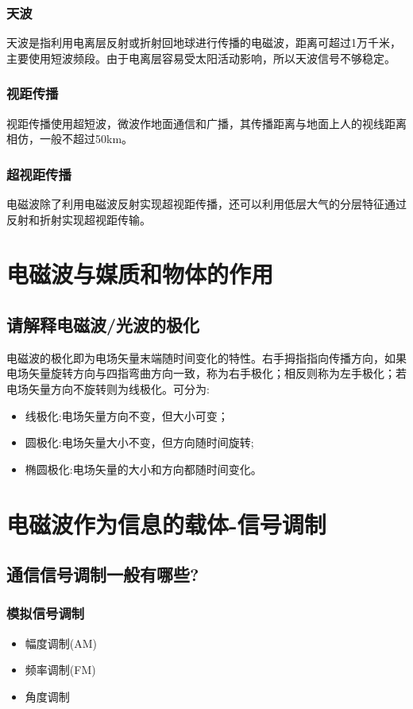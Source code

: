\documentclass[UTF8]{article}
\begin{document}
\begin{CJK}{UTF8}{gkai}
\subsubsection{天波}
天波是指利用电离层反射或折射回地球进行传播的电磁波，距离可超过1万千米，主要使用短波频段。由于电离层容易受太阳活动影响，所以天波信号不够稳定。
\subsubsection{视距传播}
视距传播使用超短波，微波作地面通信和广播，其传播距离与地面上人的视线距离相仿，一般不超过50km。
\subsubsection{超视距传播}
电磁波除了利用电磁波反射实现超视距传播，还可以利用低层大气的分层特征通过反射和折射实现超视距传输。
\section{电磁波与媒质和物体的作用}
\subsection{请解释电磁波/光波的极化}
电磁波的极化即为电场矢量末端随时间变化的特性。右手拇指指向传播方向，如果电场矢量旋转方向与四指弯曲方向一致，称为右手极化；相反则称为左手极化；若电场矢量方向不旋转则为线极化。可分为:
\begin{itemize}
  \item 线极化:电场矢量方向不变，但大小可变；
  \item 圆极化:电场矢量大小不变，但方向随时间旋转;
  \item 椭圆极化:电场矢量的大小和方向都随时间变化。
\end{itemize}

\section{电磁波作为信息的载体-信号调制}
\subsection{通信信号调制一般有哪些?}
\subsubsection{模拟信号调制}
\begin{itemize}
\item 幅度调制(AM)
\item 频率调制(FM)
\item  角度调制
\end{itemize}

\end{CJK}
\end{document}

